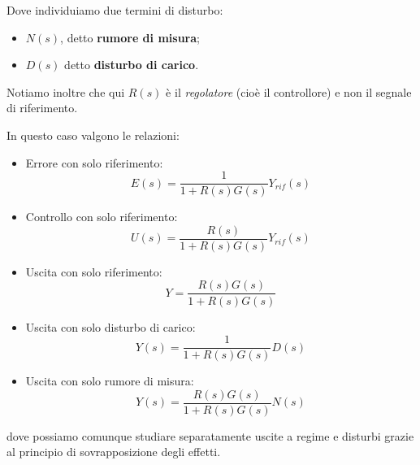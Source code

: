 \documentclass[a4paper,11pt]{article}
\begin{document}
\begin{center}
\end{center}

Dove individuiamo due termini di disturbo:
\begin{itemize}
	\item $N(s)$, detto \textbf{rumore di misura};
	\item $D(s)$ detto \textbf{disturbo di carico}.
\end{itemize}

Notiamo inoltre che qui $R(s)$ è il \textit{regolatore} (cioè il controllore) e non il segnale di riferimento.

In questo caso valgono le relazioni:
\begin{itemize}
	\item Errore con solo riferimento:
		$$
		E(s) = \frac{1}{1 + R(s) G(s)} Y_{rif}(s)
		$$
	\item Controllo con solo riferimento:
		$$
		U(s) = \frac{R(s)}{1 + R(s) G(s)} Y_{rif}(s)
		$$
	\item Uscita con solo riferimento:
		$$
		Y = \frac{R(s) G(s)}{1 + R(s) G(s)}
		$$
	\item Uscita con solo disturbo di carico:
		$$
		Y(s) = \frac{1}{1 + R(s) G(s)} D(s)
		$$
	\item Uscita con solo rumore di misura:
		$$
		Y(s) = \frac{R(s) G(s)}{1 + R(s) G(s)} N(s)
		$$
\end{itemize}
dove possiamo comunque studiare separatamente uscite a regime e disturbi grazie al principio di sovrapposizione degli effetti.
\end{document}
